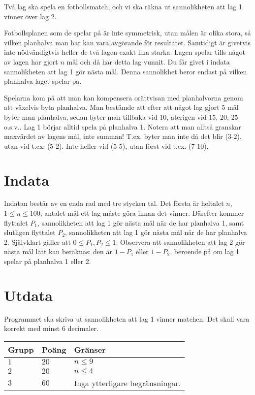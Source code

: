 
Två lag ska spela en fotbollsmatch, och vi ska räkna ut sannolikheten att lag 1 vinner över lag 2.

Fotbollsplanen som de spelar på är inte symmetrisk, utan målen är olika stora, så vilken planhalva man har kan vara avgörande för resultatet. Samtidigt är givetvis inte nödvändigtvis heller de två lagen exakt lika starka. Lagen spelar tills något av lagen har gjort $n$ mål och då har detta lag vunnit. Du får givet i indata sannolikheten att lag 1 gör nästa mål. Denna sannolikhet beror endast på vilken planhalva laget spelar på.

Spelarna kom på att man kan kompensera orättvisan med planhalvorna genom att växelvis byta planhalva. Man bestämde att efter att något lag gjort $5$ mål byter man planhalva, sedan byter man tillbaka vid $10$, återigen vid $15$, $20$, $25$ o.s.v.. Lag 1 börjar alltid spela på planhalva 1. Notera att man alltså granskar maxvärdet av lagens mål, inte summan! T.ex. byter man inte då det blir ($3$-$2$), utan vid t.ex. ($5$-$2$). Inte heller vid ($5$-$5$), utan först vid t.ex. ($7$-$10$).

\section*{Indata}
Indatan består av en enda rad med tre stycken tal. Det första är heltalet $n$, $1 \leq n \leq 100$, antalet mål ett lag måste göra innan det vinner. Därefter kommer flyttalet $P_1$, sannolikheten att lag 1 gör nästa mål när de har planhalva 1, samt slutligen flyttalet $P_2$, sannolikheten att lag 1 gör nästa mål när de har planhalva 2. Självklart gäller att $0 \leq P_1, P_2 \leq 1$. Observera att sannolikheten att lag 2 gör nästa mål lätt kan beräknas: den är $1 - P_1$ eller $1 - P_2$, beroende på om lag 1 spelar på planhalva 1 eller 2.

\section*{Utdata}
Programmet ska skriva ut sannolikheten att lag 1 vinner matchen. Det skall vara korrekt med minst $6$ decimaler.

\noindent
\begin{tabular}{| l | l | p{12cm} |}
  \hline
  \textbf{Grupp} & \textbf{Poäng} & \textbf{Gränser} \\ \hline
  $1$    & $20$          & $n \leq 9$  \\ \hline
  $2$    & $20$          & $n \leq 4$  \\ \hline
  $3$    & $60$          & Inga ytterligare begränsningar.  \\ \hline
\end{tabular}
